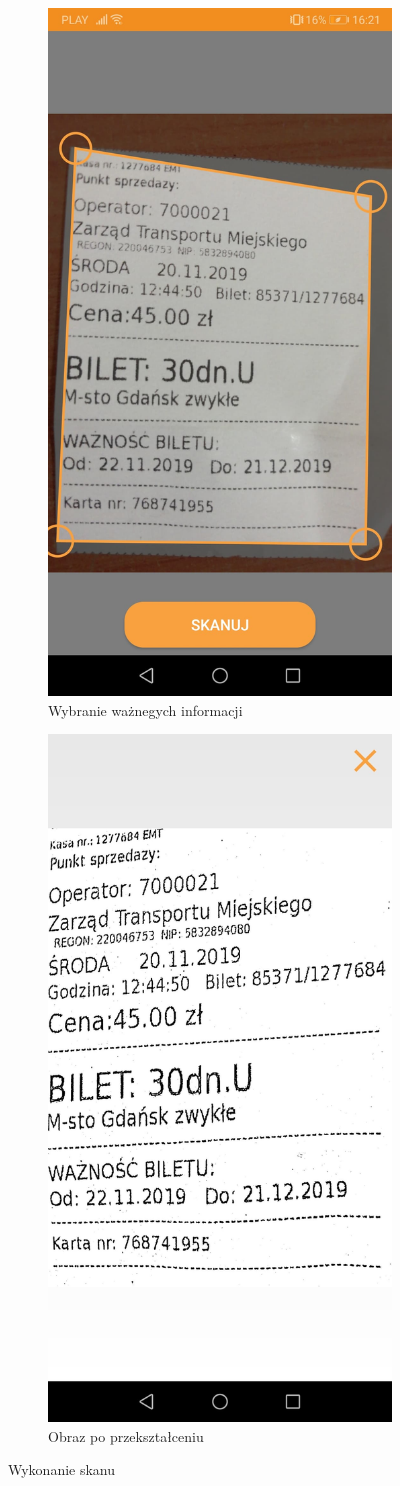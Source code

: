 \documentclass[10pt,twoside,a4paper]{report}
\begin{document}
\begin{figure}[h]
\begin{subfigure}{0.5\textwidth}
\includegraphics[width=0.9\linewidth, width=5cm]{chooseScan}
\caption{Wybranie ważnegych informacji}
\label{fig:chooseScan}
\end{subfigure}
\begin{subfigure}{0.5\textwidth}
\centering
\includegraphics[width=0.9\linewidth, width=5cm]{scan}
\caption{Obraz po przekształceniu}
\label{fig:scan}
\end{subfigure}
\caption{Wykonanie skanu}
\label{fig:podrecznik8}
\end{figure}
\end{document}
